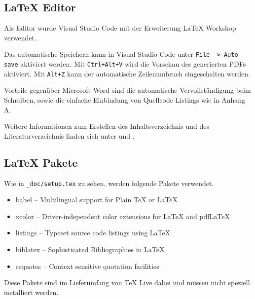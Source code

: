\subsection{LaTeX Editor}
Als Editor wurde Visual Studio Code \cite{vscode} mit der Erweiterung LaTeX Workshop \cite{latexWorkshop} verwendet.

Das automatische Speichern kann in Visual Studio Code unter \verb|File -> Auto save| aktiviert werden. Mit \verb|Ctrl+Alt+V| wird die Vorschau des generierten PDFs aktiviert. Mit \verb|Alt+Z| kann der automatische Zeilenumbruch eingeschalten werden.

Vorteile gegenüber Microsoft Word sind die automatische Vervollständigung beim Schreiben, sowie die einfache Einbindung von Quellcode Listings wie in Anhang A.

Weitere Informationen zum Erstellen des Inhaltsverzeichnis und des Literaturverzeichnis finden sich unter \cite{inhaltsverzeichnis} und \cite{literaturverzeichnis}.

\subsection{LaTeX Pakete}
Wie in \verb|_doc/setup.tex| zu sehen, werden folgende Pakete verwendet.
\begin{itemize}
    \item babel -- Multilingual support for Plain TeX or LaTeX
    \item xcolor -- Driver-independent color extensions for LaTeX and pdfLaTeX
    \item listings -- Typeset source code listings using LaTeX
    \item biblatex -- Sophisticated Bibliographies in LaTeX
    \item csquotes -- Context sensitive quotation facilities
\end{itemize}
Diese Pakete sind im Lieferumfang von TeX Live dabei und müssen nicht speziell installiert werden.
